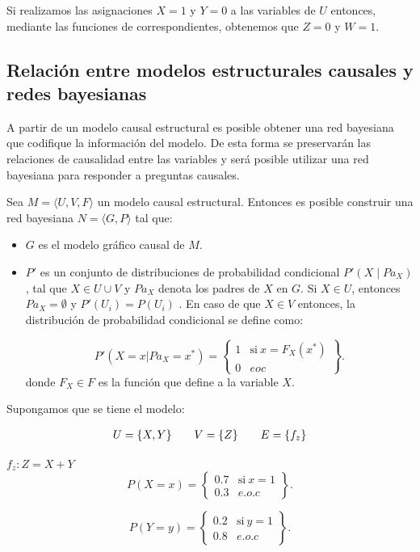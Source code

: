 Si realizamos las asignaciones $X=1$ y $Y=0$ a las variables de $U$ entonces, mediante las funciones de correspondientes, obtenemos que $Z=0$ y $W=1$.		

\subsection{Relación entre modelos estructurales causales y redes bayesianas}
\label{secc:scm-bn}
A partir de un modelo causal estructural es posible obtener una red bayesiana que codifique la información del modelo. De esta forma se preservarán las relaciones de causalidad entre las variables y será posible utilizar una red bayesiana para responder a preguntas causales.

Sea $M=\langle U,V,F \rangle$ un modelo causal estructural. Entonces es posible construir una red bayesiana $N=\langle G,P\rangle$ tal que:
\begin{itemize}
	\item $G$ es el modelo gráfico causal de $M$.
	
	\item $P'$ es un conjunto de distribuciones de probabilidad condicional $P'(X \mid Pa_X)$, tal que $X \in U \cup V$ y $Pa_X$ denota los padres de $X$ en $G$. Si $X \in U$, entonces $Pa_X = \emptyset$ y $P'(U_i)=P(U_i)$ . En caso de que $X \in V$ entonces, la distribución de probabilidad condicional se define como:
	
	\begin{equation*}
		P'(X=x|Pa_X=x^{\ast}) = 
		\left\{
		\begin{array}{ll}
			1 & \mathrm{si\ } x = F_X(x^{\ast})\\
			0 & eoc
		\end{array}
		\right\}.
	\end{equation*}
	donde $F_X \in F$ es la función que define a la variable $X$.
\end{itemize}

Supongamos que se tiene el modelo:

\begin{model}
	\[
	\arraycolsep=10pt
	\begin{array}{ccc}
		U = \{X, Y\}&
		V = \{Z\}&
		E = \{f_z\}
	\end{array}
	\]
	\begin{center}
		$f_z: Z = X + Y$
		\begin{equation*}
			P(X=x) = 
			\left\{
			\begin{array}{ll}
				0.7 & \mathrm{si\ } x = 1\\
				0.3 & e.o.c
			\end{array}
			\right\}.
		\end{equation*}
		
		\begin{equation*}
			P(Y=y) = 
			\left\{
			\begin{array}{ll}
				0.2 & \mathrm{si\ } y = 1\\
				0.8 & e.o.c
			\end{array}
			\right\}.
		\end{equation*}
	\end{center}
\end{model}

